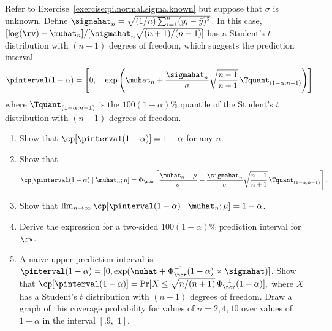 \begin{exercise1}
Refer to Exercise~\ref{exercise:pi.normal.sigma.known} but suppose
that $\sigma$ is unknown.  Define
$\sigmahat_{n}=\sqrt{(1/n)\sum_{i=1}^{n}(y_{i}-\bar{y})^{2}}$.  In this case,
$[\log(\rv) -\muhat_{n}]/[\sigmahat_{n} \sqrt{(n+1)/(n-1)}]$ has a
Student's $t$ distribution with $(n-1)$ degrees of freedom, which
suggests the prediction interval
\begin{displaymath}
\pinterval(1-\alpha)=
\left [0, \quad
\exp \left (\muhat_{n}+\frac{\sigmahat_{n}}
		 {\sigma} \sqrt{\frac{n-1}{n+1}}\, \Tquant_{(1-\alpha;n-1)}
     \right )
\right ]
\end{displaymath}
where $\Tquant_{(1-\alpha;n-1)}$ is the $100(1-\alpha)\%$ quantile of
the Student's $t$ distribution with $(n-1)$ degrees of freedom.
\begin{enumerate}
\item
Show that $\cp[\pinterval(1-\alpha)] =1-\alpha$ for any $n$.
\item
Show that 
\begin{displaymath}
\cp[\pinterval(1-\alpha) \mid \muhat_{n} ; \mu]
=
\Phi_{\nor} \left [
\frac{\muhat_{n}-\mu}{\sigma}
+ \frac{\sigmahat_{n}} {\sigma} \sqrt{\frac{n-1}{n+1}}\,
\Tquant_{(1-\alpha;n-1)} 	 \right ].
\end{displaymath}
\item
Show that $\lim_{n \to \infty}\cp[\pinterval(1-\alpha) \mid \muhat_{n} ;
\mu]=1-\alpha$.
\item
Derive the expression for a two-sided $100(1-\alpha)\%$ prediction
interval for $\rv$.
\item
A naive upper prediction interval is 
$\pinterval(1-\alpha)=[0, \exp(\muhat+ \Phi^{-1}_{\nor}(1-\alpha)
\times \sigmahat)]$.
Show that $\cp[\pinterval(1-\alpha)]=
\Pr[ X \le \sqrt{n/(n+1)} \, \Phi^{-1}_{\nor}(1-\alpha)],$
where $X$ has a  Student's $t$ distribution
with $(n-1)$ degrees of
freedom.
Draw a graph of this coverage probability for values of
$n=2,4,10$ over values of $1-\alpha$ in the interval $[.9,\,\, 1]$.
\end{enumerate}

\end{exercise1}

